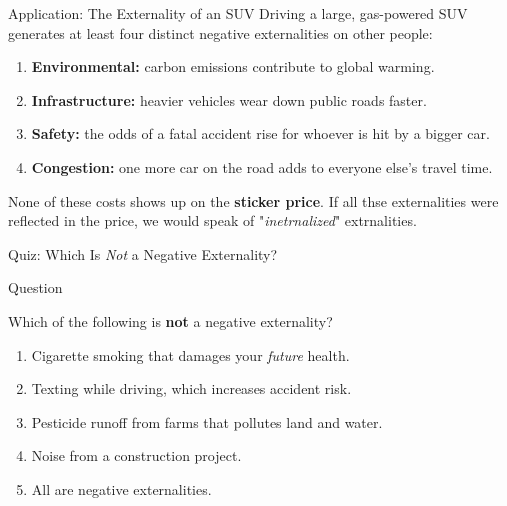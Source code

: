 \documentclass[11pt,aspectratio=169]{beamer}
\begin{document}
\begin{frame}{Application: The Externality of an SUV}
  Driving a large, gas-powered SUV generates at least four distinct negative externalities on other people:
  \begin{enumerate}
    \item \textbf{Environmental:} carbon emissions contribute to global warming.
    \item \textbf{Infrastructure:} heavier vehicles wear down public roads faster.
    \item \textbf{Safety:} the odds of a fatal accident rise for whoever is hit by a bigger car.
    \item \textbf{Congestion:} one more car on the road adds to everyone else's travel time.
  \end{enumerate}
  \vspace{0.3em}
 None of these costs shows up on the \textbf{sticker price}.  If all thse externalities were reflected in the price, we would speak of "\textit{inetrnalized}" extrnalities.
\end{frame}

\begin{frame}{Quiz: Which Is \emph{Not} a Negative Externality?}
  \begin{block}{Question}
  	  \end{block}
    Which of the following is \textbf{not} a negative externality?

  \begin{enumerate}
    \item[A.] Cigarette smoking that damages your \emph{future} health.
    \item[B.] Texting while driving, which increases accident risk.
    \item[C.] Pesticide runoff from farms that pollutes land and water.
    \item[D.] Noise from a construction project.
    \item[E.] All are negative externalities.
  \end{enumerate}

\end{frame}
\end{document}
